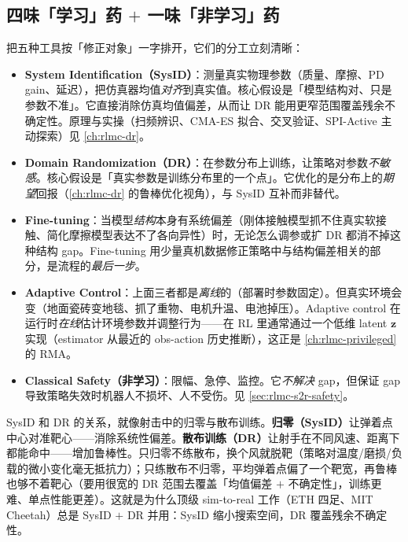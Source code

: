 \subsection{\texorpdfstring{四味「学习」药 $+$ 一味「非学习」药}{四味学习药加一味非学习药}}
\label{sec:rlmc-s2r-five-tools}

把五种工具按「修正对象」一字排开，它们的分工立刻清晰：

\begin{itemize}
  \item \textbf{System Identification（SysID）}：测量真实物理参数（质量、摩擦、PD gain、延迟），把仿真器均值\emph{对齐}到真实值。核心假设是「模型结构对、只是参数不准」。它直接消除仿真均值偏差，从而让 DR 能用更窄范围覆盖残余不确定性。原理与实操（扫频辨识、CMA-ES 拟合、交叉验证、SPI-Active 主动探索）见 \cref{ch:rlmc-dr}。
  \item \textbf{Domain Randomization（DR）}：在参数分布上训练，让策略对参数\emph{不敏感}。核心假设是「真实参数是训练分布里的一个点」。它优化的是分布上的\emph{期望}回报（\cref{ch:rlmc-dr} 的鲁棒优化视角），与 SysID 互补而非替代。
  \item \textbf{Fine-tuning}：当模型\emph{结构}本身有系统偏差（刚体接触模型抓不住真实软接触、简化摩擦模型表达不了各向异性）时，无论怎么调参或扩 DR 都消不掉这种结构 gap。Fine-tuning 用少量真机数据修正策略中与结构偏差相关的部分，是流程的\emph{最后一步}。
  \item \textbf{Adaptive Control}：上面三者都是\emph{离线}的（部署时参数固定）。但真实环境会变（地面瓷砖变地毯、抓了重物、电机升温、电池掉压）。Adaptive control 在运行时\emph{在线}估计环境参数并调整行为——在 RL 里通常通过一个低维 latent $\mathbf z$ 实现（estimator 从最近的 obs-action 历史推断），这正是 \cref{ch:rlmc-privileged} 的 RMA。
  \item \textbf{Classical Safety（非学习）}：限幅、急停、监控。它\emph{不解决} gap，但保证 gap 导致策略失效时机器人不损坏、人不受伤。见 \cref{sec:rlmc-s2r-safety}。
\end{itemize}

\begin{insight}\label{ins:rlmc-s2r-zero-spread}
SysID 和 DR 的关系，就像射击中的归零与散布训练。\textbf{归零（SysID）}让弹着点中心对准靶心——消除系统性偏差。\textbf{散布训练（DR）}让射手在不同风速、距离下都能命中——增加鲁棒性。只归零不练散布，换个风就脱靶（策略对温度/磨损/负载的微小变化毫无抵抗力）；只练散布不归零，平均弹着点偏了一个靶宽，再鲁棒也够不着靶心（要用很宽的 DR 范围去覆盖「均值偏差 $+$ 不确定性」，训练更难、单点性能更差）。这就是为什么顶级 sim-to-real 工作（ETH 四足、MIT Cheetah）总是 SysID $+$ DR 并用：SysID 缩小搜索空间，DR 覆盖残余不确定性。
\end{insight}

